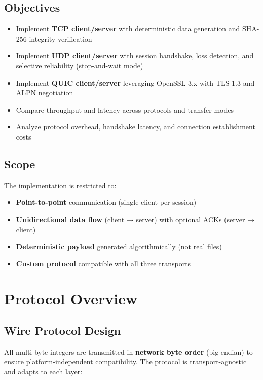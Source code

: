 \documentclass[12pt,a4paper]{article}
\begin{document}
\subsection{Objectives}
\begin{itemize}
  \item Implement \textbf{TCP client/server} with deterministic data generation and SHA-256 integrity verification
  \item Implement \textbf{UDP client/server} with session handshake, loss detection, and selective reliability (stop-and-wait mode)
  \item Implement \textbf{QUIC client/server} leveraging OpenSSL 3.x with TLS 1.3 and ALPN negotiation
  \item Compare throughput and latency across protocols and transfer modes
  \item Analyze protocol overhead, handshake latency, and connection establishment costs
\end{itemize}

\subsection{Scope}
The implementation is restricted to:
\begin{itemize}
  \item \textbf{Point-to-point} communication (single client per session)
  \item \textbf{Unidirectional data flow} (client → server) with optional ACKs (server → client)
  \item \textbf{Deterministic payload} generated algorithmically (not real files)
  \item \textbf{Custom protocol} compatible with all three transports
\end{itemize}

\section{Protocol Overview}
\label{sec:protocol}

\subsection{Wire Protocol Design}

All multi-byte integers are transmitted in \textbf{network byte order} (big-endian) to ensure platform-independent compatibility. The protocol is transport-agnostic and adapts to each layer:
\end{document}
